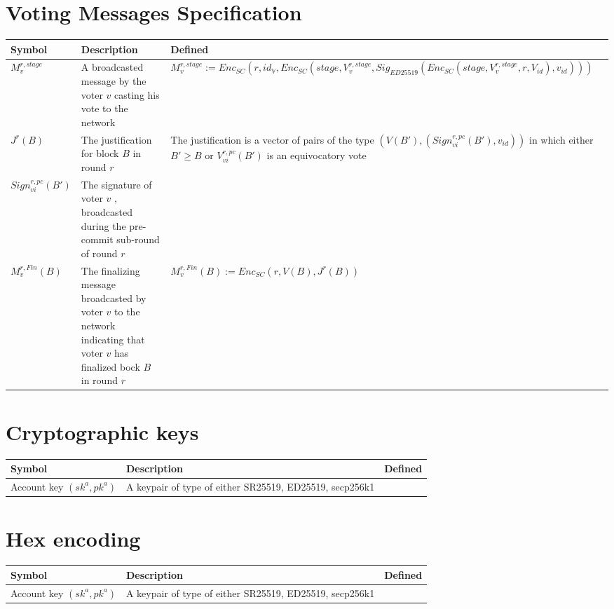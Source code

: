 \documentclass[11pt,a4paper]{article}
\begin{document}
\section*{Voting Messages Specification}
\begin{center}
 \begin{tabulary}{1.5\textwidth}{LLL}
  \textbf{Symbol} & \textbf{Description} & \textbf{Defined} \\
  \hline
\(M^{r,stage}_v\) &A broadcasted message by the voter \(v\) casting his vote to the network& \(M^{r,stage}_v := Enc_{SC}(r,id_\mathbb{V},Enc_{SC}(stage,V^{r,stage}_v,Sig_{ED25519}(Enc_{SC}(stage,V^{r,stage}_v,r,V_{id}),v_{id})))\) \\
\(J^r(B)\) &The justification for block \(B\) in round \(r\) &The justification is a vector of pairs of the type \((V(B'),(Sign^{r,pc}_{vi}(B'),v_{id}))\) in which either \(B'\geq B\) or \(V^{r,pc}_{vi}(B')\) is an equivocatory vote\\
\(Sign^{r,pc}_{vi}(B')\) &The signature of voter \(v\) , broadcasted during the pre-commit sub-round of round \(r\) \\
\(M^{r,Fin}_v(B)\) &The finalizing message broadcasted by voter \(v\) to the network indicating that voter \(v\) has finalized bock \(B\) in round \(r\) & \(M^{r,Fin}_v(B) := Enc_{SC}(r,V(B),J^r(B))\) \\
 \end{tabulary}
\end{center}

\section*{Cryptographic keys}
\begin{center}
 \begin{tabulary}{1.5\textwidth}{LLL}
  \textbf{Symbol} & \textbf{Description} & \textbf{Defined} \\
  \hline
Account key \((sk^a, pk^a)\) &A keypair of type of either SR25519, ED25519, secp256k1&\\
 \end{tabulary}
\end{center}

\section*{Hex encoding}
\begin{center}
 \begin{tabulary}{1.5\textwidth}{LLL}
  \textbf{Symbol} & \textbf{Description} & \textbf{Defined} \\
  \hline
Account key \((sk^a, pk^a)\) &A keypair of type of either SR25519, ED25519, secp256k1&\\
 \end{tabulary}
\end{center}

\newpage
\end{document}
